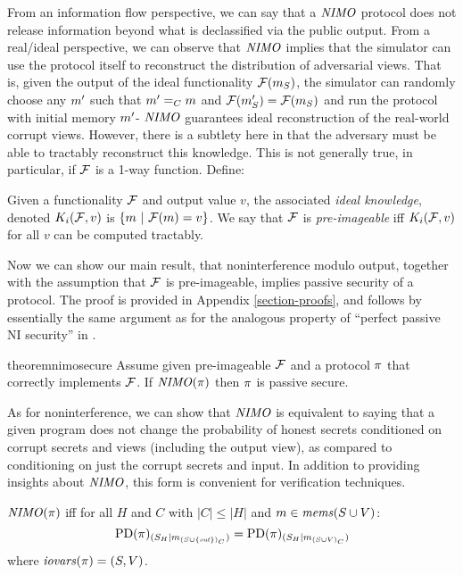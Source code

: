 From an information flow perspective, we can say that a $\mathit{NIMO}$
protocol does not release information beyond what is declassified
via the public output. From a real/ideal perspective, we can
observe that $\mathit{NIMO}$ implies that the simulator can use
the protocol itself to reconstruct the distribution of adversarial
views. That is, given the output of the ideal functionality
$\mathcal{F}(m_S)$, the simulator can randomly choose any
$m'$ such that $m' =_C m$ and $\mathcal{F}(m'_S) =
\mathcal{F}(m_S)$ and run the protocol with initial memory $m'$-
$\mathit{NIMO}$ guarantees ideal reconstruction of the real-world corrupt views. 
 However, there is a subtlety here in that the adversary
must be able to tractably reconstruct this knowledge. This is not
generally true, in particular, if $\mathcal{F}$ is a 1-way
function. Define:
\begin{definition}
  Given a functionality $\mathcal{F}$ and output value $v$, the associated
  \emph{ideal knowledge}, denoted $K_i(\mathcal{F},v)$ is
  $
  \{ m\ |\ \mathcal{F}(m) = v \}
  $.
  We say that $\mathcal{F}$ is \emph{pre-imageable} iff $K_i(\mathcal{F}, v)$ for all
  $v$ can be computed tractably.
\end{definition}
Now we can show our main result, that noninterference modulo output,
together with the assumption that $\mathcal{F}$ is pre-imageable, implies
passive security of a protocol. The proof is provided in Appendix
\ref{section-proofs}, and follows by essentially the same argument as
for the analogous property of ``perfect passive NI security'' in
\cite{8429300}.  
\begin{restatable}{theorem}{nimosecure}
  \label{theorem-nimo}
  Assume given pre-imageable $\mathcal{F}$ and a protocol $\pi$ that
  correctly implements $\mathcal{F}$.  If $\mathit{NIMO}(\pi)$
  then $\pi$ is passive secure.
\end{restatable}
As for noninterference, we can show that $\mathit{NIMO}$ is equivalent
to saying that a given program does not change the probability
of honest secrets conditioned on corrupt secrets and views
(including the output view), as compared to conditioning on
just the corrupt secrets and input. In addition to providing
insights about $\mathit{NIMO}$, this form is convenient for
verification techniques. 
\begin{lemma}
  \label{lemma-nimo}
  $\mathit{NIMO}(\pi)$ iff for all $H$ and $C$ with $|C| \le |H|$ and
  $m \in \mathit{mems}(S \cup V)$:
  $$\mathrm{PD}(\pi)_{({S_H}|{m_{(S \cup \{\mathit{out}\})_C}})} =
  \mathrm{PD}(\pi)_{({S_H}|{m_{(S\cup V)_C}})} $$
  where  $\mathit{iovars}(\pi) = (S,V)$.
\end{lemma}


